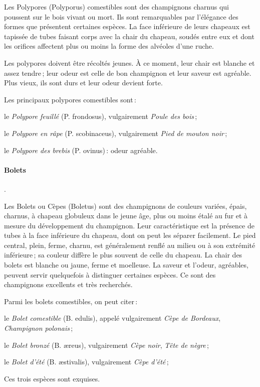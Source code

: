 Les Polypores (Polyporus) comestibles sont des champignons charnus qui poussent
sur le bois vivant ou mort. Ils sont remarquables par l'élégance des formes que
présentent certaines espèces. La face inférieure de leurs chapeaux est tapissée
de tubes faisant corps avec la chair du chapeau, soudés entre eux et dont les
orifices affectent plus ou moins la forme des alvéoles d'une ruche.

Les polypores doivent être récoltés jeunes. À ce moment, leur chair est blanche
et assez tendre ; leur odeur est celle de bon champignon et leur saveur est
agréable. Plus vieux, ils sont durs et leur odeur devient forte.

Les principaux polypores comestibles sont :

le \textit{Polypore feuillé} (P. frondosus), vulgairement \textit{Poule des
bois} ;

le \textit{Polypore en râpe} (P. scobinaceus), vulgairement \textit{Pied de
mouton noir} ;

le \textit{Polypore des brebis} (P. ovinus) : odeur agréable.

\paragraph{Bolets}.

Les Bolets ou Cèpes (Boletus) sont des champignons de couleurs variées, épais,
charnus, à chapeau globuleux dans le jeune âge, plus ou moins étalé au fur et
à mesure du développement du champignon. Leur caractéristique est la présence
de tubes à la face inférieure du chapeau, dont on peut les séparer facilement.
Le pied central, plein, ferme, charnu, est généralement renflé au milieu ou
à son extrémité inférieure ; sa couleur diffère le plus souvent de celle du
chapeau. La chair des bolets est blanche ou jaune, ferme et moelleuse. La
saveur et l'odeur, agréables, peuvent servir quelquefois à distinguer certaines
espèces. Ce sont des champignons excellents et très recherchés.

Parmi les bolets comestibles, on peut citer :

le \textit{Bolet comestible} (B. edulis), appelé vulgairement \textit{Cèpe de
Bordeaux}, \textit{Champignon polonais} ;

le \textit{Bolet bronzé} (B. æreus), vulgairement \textit{Cèpe noir},
\textit{Tête de nègre} ;

le \textit{Bolet d'été} (B. æstivalis), vulgairement \textit{Cèpe d'été} ;

Ces trois espèces sont exquises.

